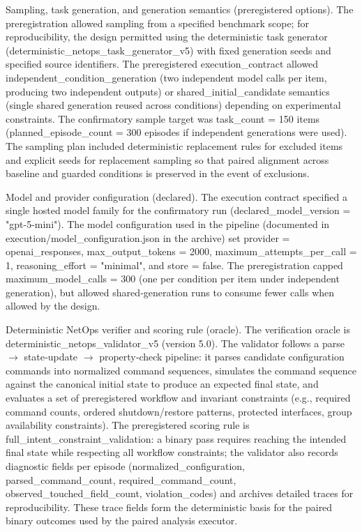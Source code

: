 \documentclass[conference]{IEEEtran}
\begin{document}
Sampling, task generation, and generation semantics (preregistered options). The preregistration allowed sampling from a specified benchmark scope; for reproducibility, the design permitted using the deterministic task generator (deterministic\_netops\_task\_generator\_v5) with fixed generation seeds and specified source identifiers. The preregistered execution\_contract allowed independent\_condition\_generation (two independent model calls per item, producing two independent outputs) or shared\_initial\_candidate semantics (single shared generation reused across conditions) depending on experimental constraints. The confirmatory sample target was task\_count = 150 items (planned\_episode\_count = 300 episodes if independent generations were used). The sampling plan included deterministic replacement rules for excluded items and explicit seeds for replacement sampling so that paired alignment across baseline and guarded conditions is preserved in the event of exclusions.

Model and provider configuration (declared). The execution contract specified a single hosted model family for the confirmatory run (declared\_model\_version = "gpt-5-mini"). The model configuration used in the pipeline (documented in execution/model\_configuration.json in the archive) set provider = openai\_responses, max\_output\_tokens = 2000, maximum\_attempts\_per\_call = 1, reasoning\_effort = "minimal", and store = false. The preregistration capped maximum\_model\_calls = 300 (one per condition per item under independent generation), but allowed shared‑generation runs to consume fewer calls when allowed by the design.

Deterministic NetOps verifier and scoring rule (oracle). The verification oracle is deterministic\_netops\_validator\_v5 (version 5.0). The validator follows a parse \ensuremath{\rightarrow} state‑update \ensuremath{\rightarrow} property‑check pipeline: it parses candidate configuration commands into normalized command sequences, simulates the command sequence against the canonical initial state to produce an expected final state, and evaluates a set of preregistered workflow and invariant constraints (e.g., required command counts, ordered shutdown/restore patterns, protected interfaces, group availability constraints). The preregistered scoring rule is full\_intent\_constraint\_validation: a binary pass requires reaching the intended final state while respecting all workflow constraints; the validator also records diagnostic fields per episode (normalized\_configuration, parsed\_command\_count, required\_command\_count, observed\_touched\_field\_count, violation\_codes) and archives detailed traces for reproducibility. These trace fields form the deterministic basis for the paired binary outcomes used by the paired analysis executor.
\end{document}
